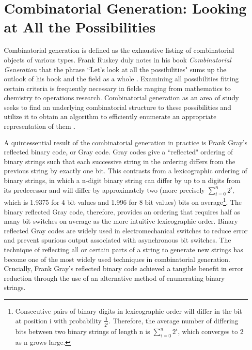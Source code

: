
\section{Combinatorial Generation: Looking at All the Possibilities}

Combinatorial generation is defined as the exhaustive listing of combinatorial objects of various types.  Frank Ruskey duly notes in his book \emph{Combinatorial Generation} that the phrase ``Let's look at all the possibilities" sums up the outlook of his book and the field as a whole \cite{ruskey2003combinatorial}. Examining all possibilities fitting certain criteria is frequently necessary in fields ranging from mathematics to chemistry to operations research. Combinatorial generation as an area of study seeks to find an underlying combinatorial structure to these possibilities and utilize it to obtain an algorithm to efficiently enumerate an appropriate representation of them \cite{ruskey2003combinatorial}. 

A quintessential result of the combinatorial generation in practice is Frank Gray's reflected binary code, or Gray code. Gray codes give a ``reflected" ordering of binary strings such that each successive string in the ordering differs from the previous string by exactly one bit. This contrasts from a lexicographic ordering of binary strings, in which a n-digit binary string can differ by up to n digits from its predecessor and will differ by approximately two (more precisely $\sum_{i=0}^n2^i$, which is 1.9375 for 4 bit values and 1.996 for 8 bit values) bits on average\footnote{Consecutive pairs of binary digits in lexicographic order will differ in the bit at position i with probability $\frac{1}{2^i}$.  Therefore, the average number of differing bits between two binary strings of length n is $\sum_{i=0}^n2^i$, which converges to 2 as n grows large.}. The binary reflected Gray code, therefore, provides an ordering that requires half as many bit switches on average as the more intuitive lexicographic order. Binary reflected Gray codes are widely used in electromechanical switches to reduce error and prevent spurious output associated with asynchronous bit switches.   The technique of reflecting all or certain parts of a string to generate new strings has become one of the most widely used techniques in combinatorial generation.
Crucially, Frank Gray's reflected binary code achieved a tangible benefit in error reduction through the use of an alternative method of enumerating binary strings.


